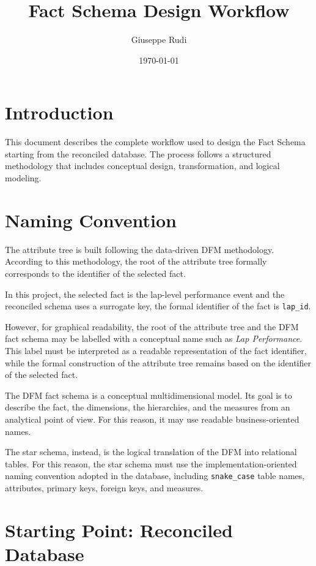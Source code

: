 \documentclass[a4paper,11pt]{article}
\title{Fact Schema Design Workflow}
\author{Giuseppe Rudi}
\date{\today}
\begin{document}
	
	\maketitle
	
	\section{Introduction}
	
	This document describes the complete workflow used to design the Fact Schema starting from the reconciled database.
	The process follows a structured methodology that includes conceptual design, transformation, and logical modeling.
	

	\section{Naming Convention}
	
	The attribute tree is built following the data-driven DFM methodology.
	According to this methodology, the root of the attribute tree formally corresponds to the
	identifier of the selected fact.
	
	In this project, the selected fact is the lap-level performance event and the reconciled
	schema uses a surrogate key, the formal identifier of the fact is \texttt{lap\_id}.
	
	However, for graphical readability, the root of the attribute tree and the DFM fact schema
	may be labelled with a conceptual name such as  \textit{Lap Performance}.
	This label must be interpreted as a readable representation of the fact identifier, while the
	formal construction of the attribute tree remains based on the identifier of the selected
	fact.
	
	
	The DFM fact schema is a conceptual multidimensional model. Its goal is to describe the
	fact, the dimensions, the hierarchies, and the measures from an analytical point of view.
	For this reason, it may use readable business-oriented names.
	
	The star schema, instead, is the logical translation of the DFM into relational tables.
	For this reason, the star schema must use the implementation-oriented naming convention
	adopted in the database, including \texttt{snake\_case} table names, attributes, primary keys,
	foreign keys, and measures.
	
	\section{Starting Point: Reconciled Database}
	
\end{document}
